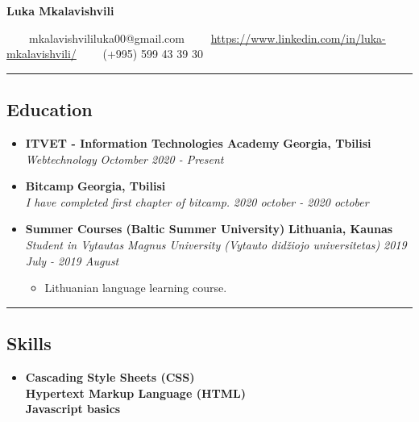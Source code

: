 \documentclass[10pt,letterpaper]{article}
\begin{document}
 
\begin{center}
{\huge \textbf{Luka Mkalavishvili}}

\vspace{1em}

\ \ \textbullet \ \ mkalavishvililuka00@gmail.com \ \  \textbullet \ \  \href{www.linkedin.com/in/luka-mkalavishvili/}{https://www.linkedin.com/in/luka-mkalavishvili/}  \ \ \textbullet \ \ (+995) 599 43 39 30
\end{center}

\hrule
\vspace{-1.0em}
\subsection*{Education}
  \begin{itemize}
    \item[]
    {\textbf{ITVET - Information Technologies Academy} \hfill
      \textbf{Georgia, Tbilisi}}
    \\
    {\emph{Webtechnology} \hfill \emph{Octomber 2020 - Present}}
    
    \item[]
    {\textbf{Bitcamp} \hfill
      \textbf{Georgia, Tbilisi}}
    \\
    {\emph{I have completed first chapter of bitcamp.
} \hfill \emph{2020 october - 2020 october}}
    
     \item[]
    {\textbf{Summer Courses (Baltic Summer University)
} \hfill
      \textbf{Lithuania, Kaunas}}
    \\
    {\emph{Student in Vytautas Magnus University (Vytauto didžiojo universitetas)
} \hfill \emph{2019 July - 2019 August}}
    \begin{itemize}[label=\textbullet]
      \itemsep0.3em
      \item Lithuanian language learning course.
    \end{itemize}
\end{itemize}

\hrule
\vspace{-1.0em}
\subsection*{Skills}
  \begin{itemize}
    \parskip=-1em
      \vspace{0.03em}

    \item[]
    {\textbf{Cascading Style Sheets (CSS)
}}
      \\
    {\textbf{Hypertext Markup Language
(HTML)
}}
    \\
    {\textbf{Javascript basics}}
    \\
  \end{itemize}
\end{document}
